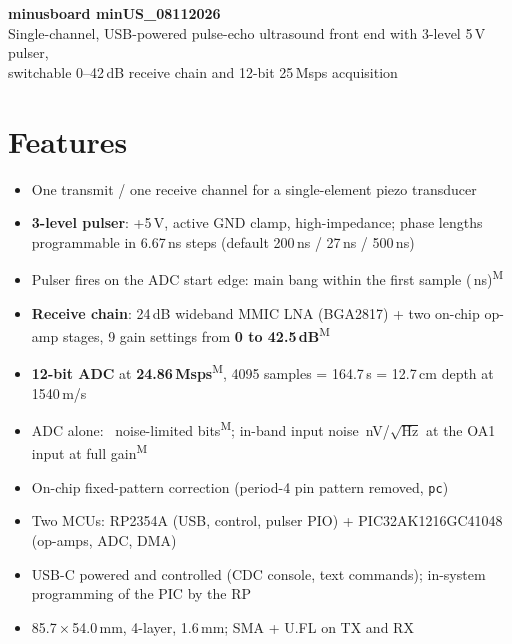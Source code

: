\documentclass[10pt,a4paper]{article}
\newcommand{\product}{minus}
\newcommand{\board}{minUS\_08112026}
\newcommand{\us}{\,\textmu s}
\newcommand{\cmd}[1]{\texttt{#1}}
\newcommand{\meas}{\textsuperscript{M}}
\begin{document}
\begin{tcolorbox}[colback=accent,colframe=accent,coltext=white,arc=0mm,boxrule=0pt,left=6pt,right=6pt,top=6pt,bottom=6pt]
{\Huge\bfseries \product}\hfill{\large\bfseries board \board}\\[2pt]
{\large Single-channel, USB-powered pulse-echo ultrasound front end with 3-level 5\,V pulser,\\
switchable 0–42\,dB receive chain and 12-bit 25\,Msps acquisition}
\end{tcolorbox}

\vspace{2pt}
\noindent
\begin{minipage}[t]{0.49\textwidth}
\section*{Features}
\begin{itemize}
  \item One transmit / one receive channel for a single-element piezo transducer
  \item \textbf{3-level pulser}: +5\,V, active GND clamp, high-impedance; phase lengths programmable in 6.67\,ns steps (default 200\,ns / 27\,ns / 500\,ns)
  \item Pulser fires on the ADC start edge: main bang within the first sample (\vonsetns\,ns)\meas{}
  \item \textbf{Receive chain}: 24\,dB wideband MMIC LNA (BGA2817) + two on-chip op-amp stages, 9 gain settings from \textbf{0 to 42.5\,dB}\meas{}
  \item \textbf{12-bit ADC} at \textbf{24.86\,Msps}\meas{}, 4095 samples = 164.7\us{} = 12.7\,cm depth at 1540\,m/s
  \item ADC alone: \vadcenob{}~noise-limited bits\meas{}; in-band input noise \veninmax{}\,nV/$\sqrt{\text{Hz}}$ at the OA1 input at full gain\meas{}
  \item On-chip fixed-pattern correction (period-4 pin pattern removed, \cmd{pc})
  \item Two MCUs: RP2354A (USB, control, pulser PIO) + PIC32AK1216GC41048 (op-amps, ADC, DMA)
  \item USB-C powered and controlled (CDC console, text commands); in-system programming of the PIC by the RP
  \item 85.7\,×\,54.0\,mm, 4-layer, 1.6\,mm; SMA + U.FL on TX and RX
\end{itemize}
\end{minipage}\hfill
\end{document}
